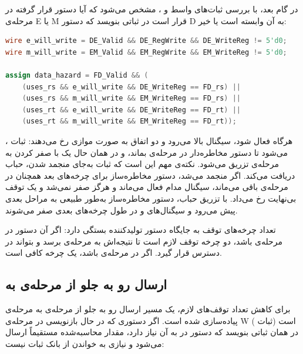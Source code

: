 در گام بعد، با بررسی ثبات‌های واسط  و ، مشخص می‌شود که آیا دستور قرار گرفته در مرحله‌ی E یا M قرار است در ثباتی بنویسد که دستور D به آن وابسته است یا خیر:

\vspace{0.2cm}
\begin{latin}
    \begin{lstlisting}[language=Verilog]
wire e_will_write = DE_Valid && DE_RegWrite && DE_WriteReg != 5'd0;
wire m_will_write = EM_Valid && EM_RegWrite && EM_WriteReg != 5'd0;

assign data_hazard = FD_Valid && (
    (uses_rs && e_will_write && DE_WriteReg == FD_rs) ||
    (uses_rs && m_will_write && EM_WriteReg == FD_rs) ||
    (uses_rt && e_will_write && DE_WriteReg == FD_rt) ||
    (uses_rt && m_will_write && EM_WriteReg == FD_rt));
    \end{lstlisting}
\end{latin}

هرگاه  فعال شود، سیگنال  بالا می‌رود و دو اتفاق به صورت موازی رخ می‌دهند: ثبات ،  می‌شود تا دستور مخاطره‌دار در مرحله‌ی  بماند، و در همان حال یک  با صفر کردن  به مرحله‌ی  تزریق می‌شود. نکته‌ی مهم این است که ثبات  به‌جای منجمد شدن، حباب دریافت می‌کند. اگر  منجمد می‌شد، دستور مخاطره‌ساز برای چرخه‌های بعد همچنان در مرحله‌ی  باقی می‌ماند، سیگنال  مدام فعال می‌ماند و  هرگز صفر نمی‌شد و یک توقف بی‌نهایت رخ می‌داد. با تزریق حباب، دستور مخاطره‌ساز به‌طور طبیعی به مراحل بعدی پیش می‌رود و سیگنال‌های  و  در طول چرخه‌های بعدی صفر می‌شوند.

تعداد چرخه‌های توقف به جایگاه دستور تولیدکننده بستگی دارد: اگر آن دستور در مرحله‌ی  باشد، دو چرخه توقف لازم است تا نتیجه‌اش به مرحله‌ی  برسد و بتواند در دسترس قرار گیرد. اگر در مرحله‌ی  باشد، یک چرخه کافی است.

\subsection{ارسال رو به جلو از مرحله‌ی  به }
برای کاهش تعداد توقف‌های لازم، یک مسیر ارسال رو به جلو از مرحله‌ی  به مرحله‌ی  پیاده‌سازی شده است. اگر دستوری که در حال بازنویسی در مرحله‌ی W است (ثبات ) در همان ثباتی بنویسد که دستور در  به آن نیاز دارد، مقدار محاسبه‌شده مستقیماً ارسال می‌شود و نیازی به خواندن از بانک ثبات نیست:


